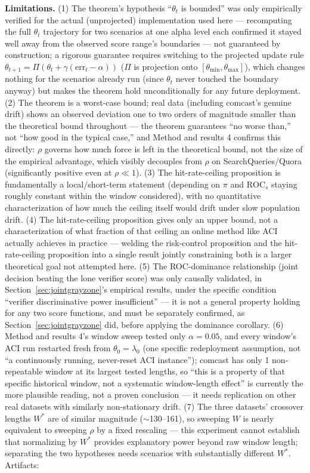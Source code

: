 \documentclass[11pt]{article}
\begin{document}
\textbf{Limitations.} (1) The theorem's hypothesis ``$\theta_t$ is bounded'' was only empirically verified for the actual (unprojected) implementation used here --- recomputing the full $\theta_t$ trajectory for two scenarios at one alpha level each confirmed it stayed well away from the observed score range's boundaries --- not guaranteed by construction; a rigorous guarantee requires switching to the projected update rule $\theta_{t+1} = \Pi(\theta_t + \gamma(\text{err}_t - \alpha))$ ($\Pi$ is projection onto $[\theta_{\min}, \theta_{\max}]$), which changes nothing for the scenarios already run (since $\theta_t$ never touched the boundary anyway) but makes the theorem hold unconditionally for any future deployment. (2) The theorem is a worst-case bound; real data (including comcast's genuine drift) shows an observed deviation one to two orders of magnitude smaller than the theoretical bound throughout --- the theorem guarantees ``no worse than,'' not ``how good in the typical case,'' and Method and results 4 confirms this directly: $\rho$ governs how much force is left in the theoretical bound, not the size of the empirical advantage, which visibly decouples from $\rho$ on SearchQueries/Quora (significantly positive even at $\rho \ll 1$). (3) The hit-rate-ceiling proposition is fundamentally a local/short-term statement (depending on $\pi$ and $\text{ROC}_s$ staying roughly constant within the window considered), with no quantitative characterization of how much the ceiling itself would drift under slow population drift. (4) The hit-rate-ceiling proposition gives only an upper bound, not a characterization of what fraction of that ceiling an online method like ACI actually achieves in practice --- welding the risk-control proposition and the hit-rate-ceiling proposition into a single result jointly constraining both is a larger theoretical goal not attempted here. (5) The ROC-dominance relationship (joint decision beating the lone verifier score) was only causally validated, in Section~\ref{sec:jointgrayzone}'s empirical results, under the specific condition ``verifier discriminative power insufficient'' --- it is not a general property holding for any two score functions, and must be separately confirmed, as Section~\ref{sec:jointgrayzone} did, before applying the dominance corollary. (6) Method and results 4's window sweep tested only $\alpha=0.05$, and every window's ACI run restarted fresh from $\theta_0=\lambda_0$ (one specific redeployment assumption, not ``a continuously running, never-reset ACI instance''); comcast has only 1 non-repeatable window at its largest tested lengths, so ``this is a property of that specific historical window, not a systematic window-length effect'' is currently the more plausible reading, not a proven conclusion --- it needs replication on other real datasets with similarly non-stationary drift. (7) The three datasets' crossover lengths $W^*$ are of similar magnitude ($\sim$130--161), so sweeping $W$ is nearly equivalent to sweeping $\rho$ by a fixed rescaling --- this experiment cannot establish that normalizing by $W^*$ provides explanatory power beyond raw window length; separating the two hypotheses needs scenarios with substantially different $W^*$. Artifacts: 
\end{document}
